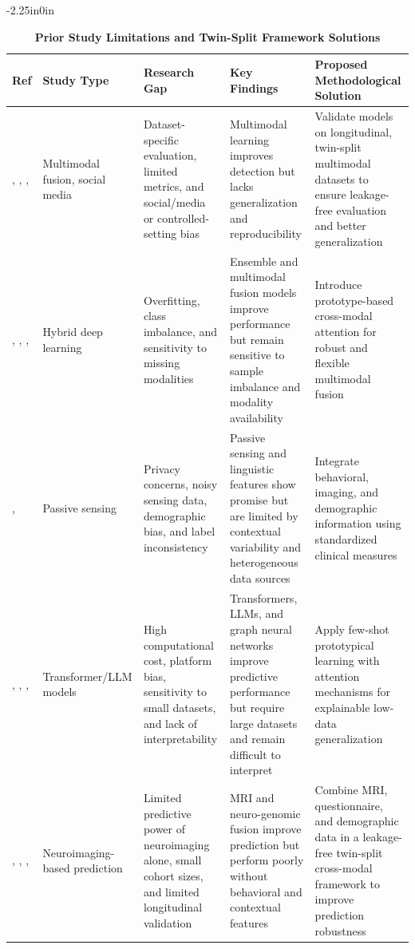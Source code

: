 \documentclass[10pt,letterpaper]{article}
\begin{document}
\begin{table}[!t]
\begin{adjustwidth}{-2.25in}{0in}
\centering
\caption{\textbf{Prior Study Limitations and Twin-Split Framework Solutions}}
\label{tab:prior_limitations}
\footnotesize
\renewcommand{\arraystretch}{1.15}

\begin{tabular}{|p{1.5cm}|p{2.2cm}|p{3.4cm}|p{3.8cm}|p{4.6cm}|}
\hline
\textbf{Ref} & \textbf{Study Type} & \textbf{Research Gap} & \textbf{Key Findings} & \textbf{Proposed Methodological Solution} \\
\hline

\cite{ref1}, \cite{ref2}, \cite{ref3}, \cite{ref4}
& Multimodal fusion, social media
& Dataset-specific evaluation, limited metrics, and social/media or controlled-setting bias
& Multimodal learning improves detection but lacks generalization and reproducibility
& Validate models on longitudinal, twin-split multimodal datasets to ensure leakage-free evaluation and better generalization \\
\hline

\cite{ref5}, \cite{ref6}, \cite{ref7}, \cite{ref8}
& Hybrid deep learning
& Overfitting, class imbalance, and sensitivity to missing modalities
& Ensemble and multimodal fusion models improve performance but remain sensitive to sample imbalance and modality availability
& Introduce prototype-based cross-modal attention for robust and flexible multimodal fusion \\
\hline

\cite{ref9}, \cite{ref12}
& Passive sensing
& Privacy concerns, noisy sensing data, demographic bias, and label inconsistency
& Passive sensing and linguistic features show promise but are limited by contextual variability and heterogeneous data sources
& Integrate behavioral, imaging, and demographic information using standardized clinical measures \\
\hline

\cite{ref16}, \cite{ref17}, \cite{ref20}, \cite{ref21}
& Transformer/LLM models
& High computational cost, platform bias, sensitivity to small datasets, and lack of interpretability
& Transformers, LLMs, and graph neural networks improve predictive performance but require large datasets and remain difficult to interpret
& Apply few-shot prototypical learning with attention mechanisms for explainable low-data generalization \\
\hline

\cite{ref23}, \cite{ref24}, \cite{ref25}, \cite{ref27}
& Neuroimaging-based prediction
& Limited predictive power of neuroimaging alone, small cohort sizes, and limited longitudinal validation
& MRI and neuro-genomic fusion improve prediction but perform poorly without behavioral and contextual features
& Combine MRI, questionnaire, and demographic data in a leakage-free twin-split cross-modal framework to improve prediction robustness \\
\hline


\end{tabular}
\end{adjustwidth}
\end{table}
\end{document}
